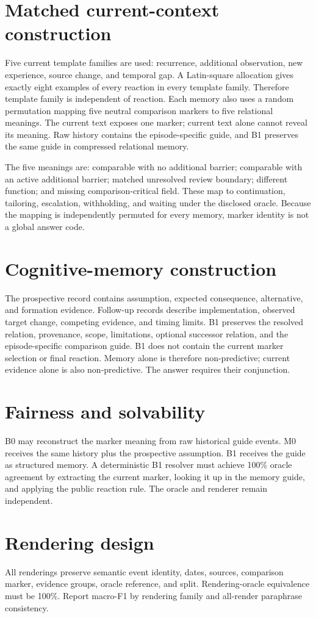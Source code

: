 \documentclass[10.5pt]{article}\usepackage[margin=.82in]{geometry}\usepackage[T1]{fontenc}\usepackage{lmodern,microtype,booktabs,longtable,amsmath,xcolor,hyperref,fancyhdr}
\begin{document}
\section{Matched current-context construction}Five current template families are used: recurrence, additional observation, new experience, source change, and temporal gap. A Latin-square allocation gives exactly eight examples of every reaction in every template family. Therefore template family is independent of reaction. Each memory also uses a random permutation mapping five neutral comparison markers to five relational meanings. The current text exposes one marker; current text alone cannot reveal its meaning. Raw history contains the episode-specific guide, and B1 preserves the same guide in compressed relational memory.

The five meanings are: comparable with no additional barrier; comparable with an active additional barrier; matched unresolved review boundary; different function; and missing comparison-critical field. These map to continuation, tailoring, escalation, withholding, and waiting under the disclosed oracle. Because the mapping is independently permuted for every memory, marker identity is not a global answer code.
\section{Cognitive-memory construction}The prospective record contains assumption, expected consequence, alternative, and formation evidence. Follow-up records describe implementation, observed target change, competing evidence, and timing limits. B1 preserves the resolved relation, provenance, scope, limitations, optional successor relation, and the episode-specific comparison guide. B1 does not contain the current marker selection or final reaction. Memory alone is therefore non-predictive; current evidence alone is also non-predictive. The answer requires their conjunction.
\section{Fairness and solvability}B0 may reconstruct the marker meaning from raw historical guide events. M0 receives the same history plus the prospective assumption. B1 receives the guide as structured memory. A deterministic B1 resolver must achieve 100\% oracle agreement by extracting the current marker, looking it up in the memory guide, and applying the public reaction rule. The oracle and renderer remain independent.
\section{Rendering design}All renderings preserve semantic event identity, dates, sources, comparison marker, evidence groups, oracle reference, and split. Rendering-oracle equivalence must be 100\%. Report macro-F1 by rendering family and all-render paraphrase consistency.
\end{document}

